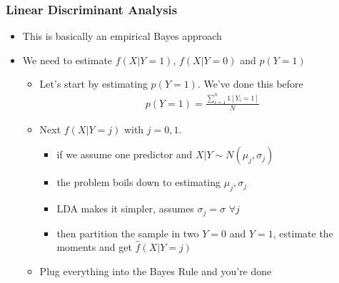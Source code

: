 \documentclass[
  shownotes,
  xcolor={svgnames},
  hyperref={colorlinks,citecolor=DarkBlue,linkcolor=DarkRed,urlcolor=DarkBlue}
  , aspectratio=169]{beamer}
\begin{document}
\begin{frame}[fragile]
\frametitle{Linear Discriminant Analysis}
\begin{itemize}
  \item This is basically an empirical Bayes approach
  \item We need to estimate $f(X|Y=1)$,  $f(X|Y=0)$ and $p(Y=1)$ 
  \begin{itemize}
    \item Let's start by estimating $p(Y=1)$. We've done this before
    \begin{align}
    p(Y=1) = \frac{\sum_{i=1}^n 1[Y_i=1]}{N}
    \end{align}
    \item Next $f(X|Y=j)$ with $j=0,1$. 
    \begin{itemize}
    \item if we assume one predictor and $X|Y\sim N(\mu_j,\sigma_j)$
    \item the problem boils down to estimating $\mu_j,\sigma_j$
    \item LDA makes it simpler, assumes $\sigma_j=\sigma$ $\forall j$
    \item then partition the sample in two $Y=0$ and $Y=1$, estimate the moments and get $\hat{f}(X|Y=j)$
    \end{itemize}
    \item Plug everything into the Bayes Rule and you're done
    

  \end{itemize}
\end{itemize}


\end{frame}
\end{document}
